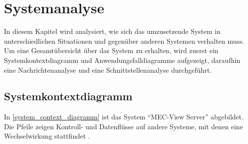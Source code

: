

\chapter{Systemanalyse}
\label{analysis}

In diesem Kapitel wird analysiert, wie sich das umzusetzende System in unterschiedlichen Situationen und gegenüber anderen Systemen verhalten muss.
Um eine Gesamtübersicht über das System zu erhalten, wird zuerst ein Systemkontextdiagramm und Anwendungsfalldiagramme aufgezeigt, daraufhin eine Nachrichtenanalyse und eine Schnittstellenanalyse durchgeführt.



\section{Systemkontextdiagramm}
\label{system_context}


In \autoref{system_context_diagramm} ist das System \enquote{MEC-View Server} abgebildet.
Die Pfeile zeigen Kontroll- und Datenflüsse auf andere  Systeme, mit denen eine Wechselwirkung stattfindet \cite[501]{goll2012methoden}.

